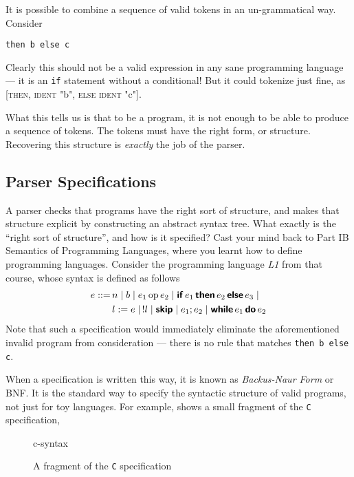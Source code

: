 It is possible to combine a sequence of valid tokens in an un-grammatical way. Consider
\begin{verbatim}
then b else c
\end{verbatim}
Clearly this should not be a valid expression in any sane programming language --- it is an \texttt{if} statement without a conditional! But it could tokenize just fine, as [\textsc{then}, \textsc{ident} "b", \textsc{else} \textsc{ident} "c"].

What this tells us is that to be a program, it is not enough to be able to produce a sequence of tokens. The tokens must have the right form, or structure. Recovering this structure is \textit{exactly} the job of the parser.

\subsection{Parser Specifications}\label{section:parser-generators}
A parser checks that programs have the right sort of structure, and makes that structure explicit by constructing an abstract syntax tree. What exactly is the ``right sort of structure'', and how is it specified? Cast your mind back to \textsf{Part IB Semantics of Programming Languages}, where you learnt how to define programming languages. Consider the programming language \textit{L1} from that course, whose syntax is defined as follows
\begin{align*}
    e ::= & \, n \mid b \mid e_1 \, \text{op} \, e_2 \mid \textbf{\textsf{if}} \, e_1 \, \textbf{\textsf{then}} \, e_2 \, \textbf{\textsf{else}} \, e_3 \mid \\
    & \, l := e \mid \, !l \mid \textbf{\textsf{skip}} \mid e_1 ; e_2 \mid \textbf{\textsf{while}} \, e_1 \, \textbf{\textsf{do}} \, e_2
\end{align*}
Note that such a specification would immediately eliminate the aforementioned invalid program from consideration --- there is no rule that matches \texttt{then b else c}.

When a specification is written this way, it is known as \textit{Backus-Naur Form} or BNF. It is the standard way to specify the syntactic structure of valid programs, not just for toy languages. For example,  shows a small fragment of the \texttt{C} specification,

\begin{figure}[H]
    \centering
    {c-syntax}
    \caption{A fragment of the \texttt{C} specification}
    \label{figures:c-syntax}
\end{figure}

